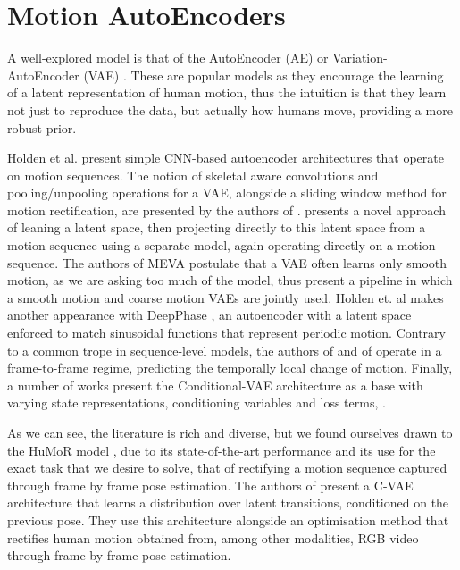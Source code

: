 \section{Motion AutoEncoders}

A well-explored model is that of the AutoEncoder (AE) \cite{bank2021_autoencoders} or Variation-AutoEncoder (VAE) \cite{kingma2022_VAE}. These are popular models as they encourage the learning of a latent representation \cite{bank2021_autoencoders} of human motion, thus the intuition is that they learn not just to reproduce the data, but actually how humans move, providing a more robust prior.


Holden et al. \cite{ConvAutoEnv2015} \cite{ConvAutoEnv2016} present simple CNN-based autoencoder architectures that operate on motion sequences. The notion of skeletal aware convolutions and pooling/unpooling operations for a VAE, alongside a sliding window method for motion rectification, are presented by the authors of \cite{HierarchicalMotionVAE}. \cite{TransformerVAEPrior} presents a novel approach of leaning a latent space, then projecting directly to this latent space from a motion sequence using a separate model, again operating directly on a motion sequence. The authors of MEVA \cite{MEVA} postulate that a VAE often learns only smooth motion, as we are asking too much of the model, thus present a pipeline in which a smooth motion and coarse motion VAEs are jointly used. Holden et. al makes another appearance with DeepPhase \cite{DeepPhase}, an autoencoder with a latent space enforced to match sinusoidal functions that represent periodic motion. Contrary to a common trope in sequence-level models, the authors of \cite{learnedInbetweening} and of \cite{MotionVAE} operate in a frame-to-frame regime, predicting the temporally local change of motion. Finally, a number of works present the Conditional-VAE architecture \cite{CVAE} as a base with varying state representations, conditioning variables and loss terms, \cite{humor, learnedInbetweening, MotionVAE, structured4Dlatentspace}.

As we can see, the literature is rich and diverse, but we found ourselves drawn to the HuMoR model \cite{humor}, due to its state-of-the-art performance and its use for the exact task that we desire to solve, that of rectifying a motion sequence captured through frame by frame pose estimation. The authors of \cite{humor} present a C-VAE architecture that learns a distribution over latent transitions, conditioned on the previous pose. They use this architecture alongside an optimisation method that rectifies human motion obtained from, among other modalities, RGB video through frame-by-frame pose estimation.

